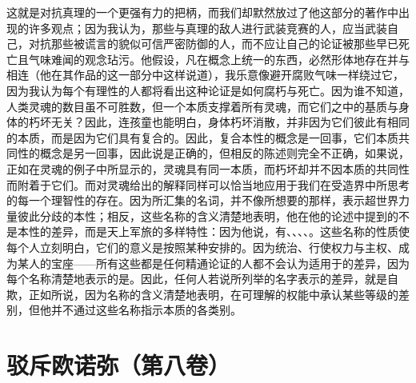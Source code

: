 这就是对抗真理的一个更强有力的把柄，而我们却默然放过了他这部分的著作中出现的许多观点；因为我认为，那些与真理的敌人进行武装竞赛的人，应当武装自己，对抗那些被谎言的貌似可信严密防御的人，而不应让自己的论证被那些早已死亡且气味难闻的观念玷污。他假设，凡在概念上统一的东西，必然形体地存在并与相连（他在其作品的这一部分中这样说道），我乐意像避开腐败气味一样绕过它，因为我认为每个有理性的人都将看出这种论证是如何腐朽与死亡。因为谁不知道，人类灵魂的数目虽不可胜数，但一个本质支撑着所有灵魂，而它们之中的基质与身体的朽坏无关？因此，连孩童也能明白，身体朽坏消散，并非因为它们彼此有相同的本质，而是因为它们具有复合的。因此，复合本性的概念是一回事，它们本质共同性的概念是另一回事，因此说是正确的，但相反的陈述则完全不正确，如果说，正如在灵魂的例子中所显示的，灵魂具有同一本质，而朽坏却并不因本质的共同性而附着于它们。而对灵魂给出的解释同样可以恰当地应用于我们在受造界中所思考的每一个理智性的存在。因为所汇集的名词，并不像所想要的那样，表示超世界力量彼此分歧的本性；相反，这些名称的含义清楚地表明，他在他的论述中提到的不是本性的差异，而是天上军旅的多样特性：因为他说，有、、、、。这些名称的性质使每个人立刻明白，它们的意义是按照某种安排的。因为统治、行使权力与主权、成为某人的宝座——所有这些都是任何精通论证的人都不会认为适用于的差异，因为每个名称清楚地表示的是。因此，任何人若说所列举的名字表示的差异，就是自欺，正如所说，因为名称的含义清楚地表明，在可理解的权能中承认某些等级的差别，但他并不通过这些名称指示本质的各类别。\par



\section{驳斥欧诺弥（第八卷）}

